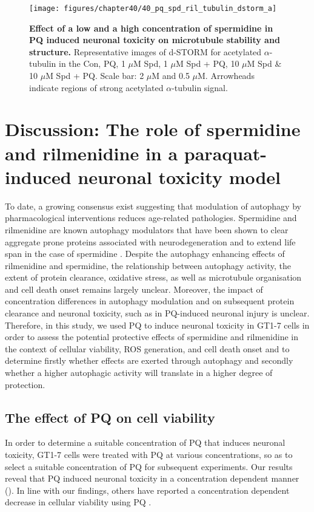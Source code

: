 \begin{landscape}\centering
\begin{figure}
\vspace*{\fill}
\centering
  \texttt{[image: figures/chapter40/40\_pq\_spd\_ril\_tubulin\_dstorm\_a]}
  \caption[Effect of a low and a high concentration of spermidine in PQ induced neuronal toxicity on microtubule stability and structure]{\textbf{Effect of a low and a high concentration of spermidine in PQ induced neuronal toxicity on microtubule stability and structure.} Representative images of d-STORM for acetylated $\alpha$-tubulin in the Con, PQ, 1 $\mu$M Spd, 1 $\mu$M Spd + PQ, 10 $\mu$M Spd \& 10 $\mu$M Spd + PQ. Scale bar: 2 $\mu$M and 0.5 $\mu$M. Arrowheads indicate regions of strong acetylated $\alpha$-tubulin signal.}
  \label{fig:40_pq_spd_ril_tubulin_dstorm_a}
\end{figure} 
\end{landscape}

\section{Discussion: The role of spermidine and rilmenidine in a paraquat-induced neuronal toxicity model}
To date, a growing consensus exist suggesting that modulation of autophagy by pharmacological interventions reduces age-related pathologies. Spermidine and rilmenidine are known autophagy modulators that have been shown to clear aggregate prone proteins associated with neurodegeneration \citep{Bhukel2017,Buttner2014,Rose2010,Sigrist2014} and to extend life span in the case of spermidine \citep{Madeo2010,Morselli2009}. Despite the autophagy enhancing effects of rilmenidine and spermidine, the relationship between autophagy activity, the extent of protein clearance, oxidative stress, as well as microtubule organisation and cell death onset remains largely unclear. Moreover, the impact of concentration differences in autophagy modulation and on subsequent protein clearance and neuronal toxicity, such as in PQ-induced neuronal injury is unclear. Therefore, in this study, we used PQ to induce neuronal toxicity in GT1-7 cells in order to assess the potential protective effects of spermidine and rilmenidine in the context of cellular viability, ROS generation, and cell death onset and to determine firstly whether effects are exerted through autophagy and secondly whether a higher autophagic activity will translate in a higher degree of protection. 

\subsection{ The effect of PQ on cell viability}
In order to determine a suitable concentration of PQ that induces neuronal toxicity, GT1-7 cells were treated with PQ at various concentrations, so as to select a suitable concentration of PQ for subsequent experiments. Our results reveal that PQ induced neuronal toxicity in a concentration dependent manner (). In line with our findings, others have reported a concentration dependent decrease in cellular viability using PQ \citep{Chen2012b,Jaroonwitchawan2017,Mehdi2013}. 


